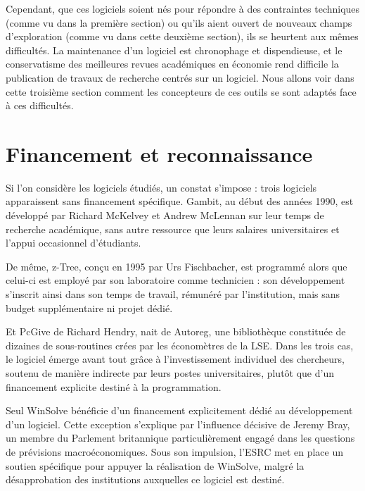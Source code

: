 Cependant, que ces logiciels soient nés pour répondre à des contraintes techniques (comme vu dans la première section) ou qu’ils aient ouvert de nouveaux champs d’exploration (comme vu dans cette deuxième section), ils se heurtent aux mêmes difficultés. La maintenance d'un logiciel est chronophage et dispendieuse, et le conservatisme des meilleures revues académiques en économie rend difficile la publication de travaux de recherche centrés sur un logiciel. Nous allons voir dans cette troisième section comment les concepteurs de ces outils se sont adaptés face à ces difficultés.



\section{Financement et reconnaissance}



Si l’on considère les logiciels étudiés, un constat s’impose : trois logiciels apparaissent sans financement spécifique. Gambit, au début des années 1990, est développé par Richard McKelvey et Andrew McLennan sur leur temps de recherche académique, sans autre ressource que leurs salaires universitaires et l’appui occasionnel d’étudiants. 

De même, z-Tree, conçu en 1995 par Urs Fischbacher, est programmé alors que celui-ci est employé par son laboratoire comme technicien : son développement s’inscrit ainsi dans son temps de travail, rémunéré par l’institution, mais sans budget supplémentaire ni projet dédié. 

Et PcGive de Richard Hendry, nait de Autoreg, une bibliothèque constituée de dizaines de sous-routines crées par les économètres de la LSE. Dans les trois cas, le logiciel émerge avant tout grâce à l’investissement individuel des chercheurs, soutenu de manière indirecte par leurs postes universitaires, plutôt que d’un financement explicite destiné à la programmation. 

Seul WinSolve bénéficie d’un financement explicitement dédié au développement d’un logiciel. Cette exception s’explique par l’influence décisive de Jeremy Bray, un membre du Parlement britannique particulièrement engagé dans les questions de prévisions macroéconomiques. Sous son impulsion, l’ESRC met en place un soutien spécifique pour appuyer la réalisation de WinSolve, malgré la désapprobation des institutions auxquelles ce logiciel est destiné. 

